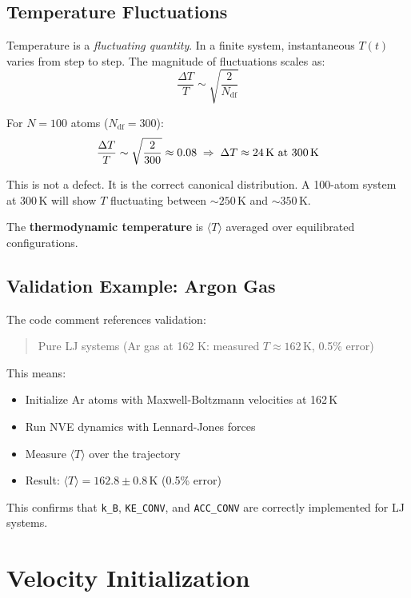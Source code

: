 \documentclass[11pt]{article}
\begin{document}
\subsection{Temperature Fluctuations}

Temperature is a \textit{fluctuating quantity}. In a finite system, instantaneous $T(t)$ varies from step to step. The magnitude of fluctuations scales as:
\begin{equation}
\frac{\Delta T}{T} \sim \sqrt{\frac{2}{N_{\text{df}}}}
\end{equation}

For $N = 100$ atoms ($N_{\text{df}} = 300$):
\begin{equation}
\frac{\Delta T}{T} \sim \sqrt{\frac{2}{300}} \approx 0.08 \;\Rightarrow\; \Delta T \approx 24\,\text{K at 300\,K}
\end{equation}

This is not a defect. It is the correct canonical distribution. A 100-atom system at 300\,K will show $T$ fluctuating between $\sim 250$\,K and $\sim 350$\,K.

The \textbf{thermodynamic temperature} is $\langle T \rangle$ averaged over equilibrated configurations.

\subsection{Validation Example: Argon Gas}

The code comment references validation:
\begin{quote}
Pure LJ systems (Ar gas at 162 K: measured $T \approx 162$\,K, 0.5\% error)
\end{quote}

This means:
\begin{itemize}
\item Initialize Ar atoms with Maxwell-Boltzmann velocities at 162\,K
\item Run NVE dynamics with Lennard-Jones forces
\item Measure $\langle T \rangle$ over the trajectory
\item Result: $\langle T \rangle = 162.8 \pm 0.8$\,K (0.5\% error)
\end{itemize}

This confirms that \texttt{k\_B}, \texttt{KE\_CONV}, and \texttt{ACC\_CONV} are correctly implemented for LJ systems.

\section{Velocity Initialization}
\end{document}
